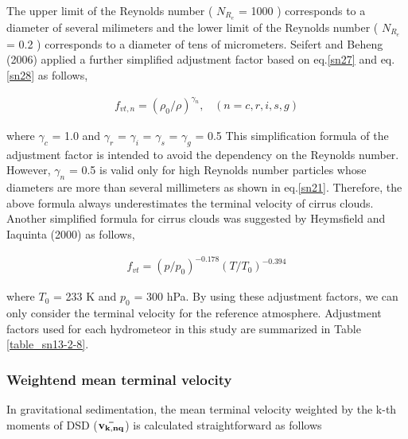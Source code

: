 The upper limit of the Reynolds number ( $N_{R_{e}}$ = 1000 ) corresponds to a diameter of several milimeters and the lower limit of the Reynolds number ( $N_{R_{e}}$ = 0.2 ) corresponds to a diameter of tens of micrometers. Seifert and Beheng (2006) applied a further simplified adjustment factor based on eq.\ref{sn27} and eq.\ref{sn28} as follows,

\begin{eqnarray}
f_{vt,n}=(\rho_{0}/\rho)^{\gamma_{n}}, \;\;\;(n=c,r,i,s,g)
\label{sn30}
\end{eqnarray}

where $\gamma_{c}$ = 1.0 and $\gamma_{r}$ = $\gamma_{i}$ = $\gamma_{s}$ = $\gamma_{g}$ = 0.5 This simplification formula of the adjustment factor is intended to avoid the dependency on the Reynolds number. However, $\gamma_{n}$ = 0.5 is valid only for high Reynolds number particles whose diameters are more than several millimeters as shown in eq.\ref{sn21}. Therefore, the above formula always underestimates the terminal velocity of cirrus clouds. Another simplified formula for cirrus clouds was suggested by Heymsfield and Iaquinta (2000) as follows,

\begin{eqnarray}
f_{vt}=(p/p_{0})^{-0.178}(T/T_{0})^{-0.394}
\label{sn31}
\end{eqnarray}

where $T_{0}$ = 233 K and $p_{0}$ = 300 hPa. By using these adjustment factors, we can only consider the terminal velocity for the reference atmosphere. Adjustment factors used for each hydrometeor in this study are summarized in Table \ref{table_sn13-2-8}.

\begin{table}[h]
\begin{center}
\caption{Adjustment factor for the reference terminal velocity.}
\label{table_sn13-2-8}
\end{center}
\end{table}


\subsubsection{Weightend mean terminal velocity}
In gravitational sedimentation, the mean terminal velocity weighted by the k-th moments of DSD (${\bf \bar{v_{k,nq}}}$) is calculated straightforward as follows


